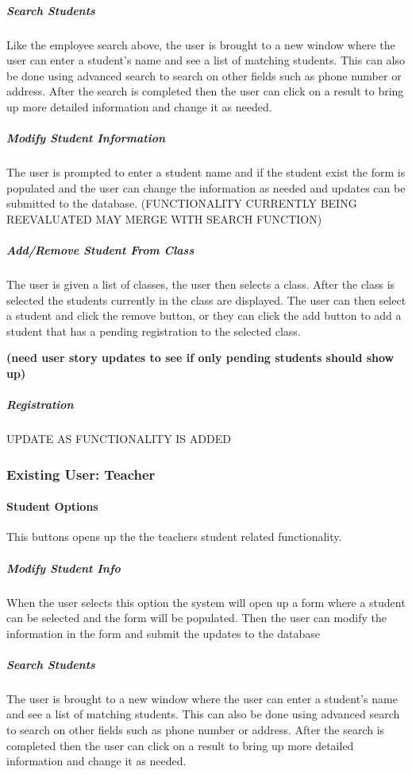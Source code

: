 \subparagraph{Search Students}
Like the employee search above, the user is brought to a new window where the user can enter a student's name and see a list of matching students. This can also be done using advanced search to search on other fields such as phone number or address. After the search is completed then the user can click on a result to bring up more detailed information and change it as needed. 

\subparagraph{Modify Student Information}
The user is prompted to enter a student name and if the student exist the form is populated and the user can change the information as needed and updates can be submitted to the database.
(FUNCTIONALITY CURRENTLY BEING REEVALUATED MAY MERGE WITH SEARCH FUNCTION)

\subparagraph{Add/Remove Student From Class}
The user is given a list of classes, the user then selects a class. After the class is selected the students currently in the class are displayed. The user can then select a student and click the remove button, or they can click the add button to add a student that has a pending registration to the selected class.

\bf(need user story updates to see if only pending students should show up)


\subparagraph{Registration}
UPDATE AS FUNCTIONALITY IS ADDED


\subsubsection{Existing User: Teacher}

\paragraph{Student Options}
This buttons opens up the the teachers student related functionality.

\subparagraph{Modify Student Info}
When the user selects this option the system will open up a form where a student can be selected and the form will be populated. Then the user can modify the information in the form and submit the updates to the database

\subparagraph{Search Students}
The user is brought to a new window where the user can enter a student's name and see a list of matching students. This can also be done using advanced search to search on other fields such as phone number or address. After the search is completed then the user can click on a result to bring up more detailed information and change it as needed. 

